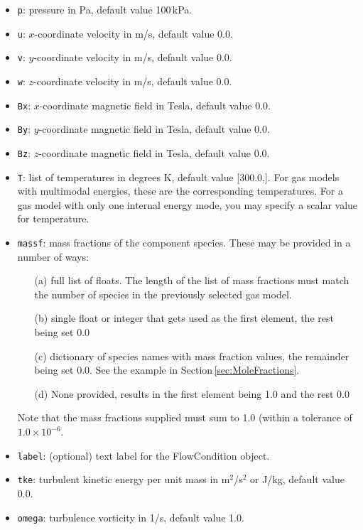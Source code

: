 %
\begin{itemize}
  \item \texttt{p}: pressure in Pa, default value 100\,kPa.
  \item \texttt{u}: $x$-coordinate velocity in m/s, default value 0.0.
  \item \texttt{v}: $y$-coordinate velocity in m/s, default value 0.0.
  \item \texttt{w}: $z$-coordinate velocity in m/s, default value 0.0.
  \item \texttt{Bx}: $x$-coordinate magnetic field in Tesla, default value 0.0.
  \item \texttt{By}: $y$-coordinate magnetic field in Tesla, default value 0.0.
  \item \texttt{Bz}: $z$-coordinate magnetic field in Tesla, default value 0.0.
  \item \texttt{T}: list of temperatures in degrees K, default value [300.0,].
    For gas models with multimodal energies, these are the corresponding temperatures.
    For a gas model with only one internal energy mode, you may specify a scalar value
    for temperature.
  \item \texttt{massf}: mass fractions of the component species.
    These may be provided in a number of ways:
    \begin{itemize}
      \item[(a)] full list of floats. The length of the list of mass fractions 
         must match the number of species in the previously selected gas model.
      \item[(b)] single float or integer that gets used as the first element,
         the rest being set 0.0
      \item[(c)] dictionary of species names with mass fraction values,
         the remainder being set 0.0.  See the example in Section\,\ref{sec:MoleFractions}.
      \item[(d)] None provided, results in the first element being 1.0
         and the rest 0.0
    \end{itemize}
    Note that the mass fractions supplied must sum to 1.0 (within a tolerance of $1.0 \times 10^{-6}$.
  \item \texttt{label}: (optional) text label for the FlowCondition object.
  \item \texttt{tke}: turbulent kinetic energy per unit mass in m$^2$/s$^2$ or
    J/kg, default value 0.0.
  \item \texttt{omega}: turbulence vorticity in 1/s, default value 1.0.

\end{itemize}
